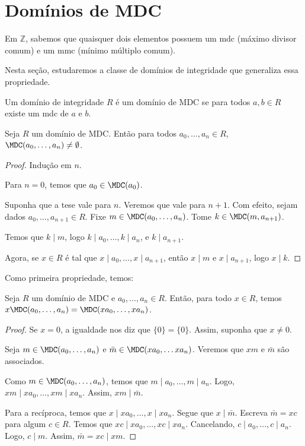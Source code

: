 \section{Domínios de MDC}
Em $\mathbb Z$, sabemos que quaisquer dois elementos possuem um mdc (máximo divisor comum) e um mmc (mínimo múltiplo comum).

Nesta seção, estudaremos a classe de domínios de integridade que generaliza essa propriedade.

\begin{definition}
    Um domínio de integridade $R$ é um domínio de MDC se para todos $a, b \in R$ existe um mdc de $a$ e $b$.
\end{definition}

\begin{lemma}
    Seja $R$ um domínio de MDC. Então para todos $a_0, \dots, a_n \in R$, $\MDC(a_0, \dots, a_n)\neq \emptyset$.
\end{lemma}
\begin{proof}
Indução em $n$.

Para $n=0$, temos que $a_0\in \MDC(a_0)$.

Suponha que a tese vale para $n$.
Veremos que vale para $n+1$.
Com efeito, sejam dados $a_0, \dots, a_{n+1}\in R$. Fixe $m \in \MDC(a_0, \dots, a_n)$.
Tome $k \in \MDC(m, a_{n+1})$.

Temos que $k\mid m$, logo $k\mid a_0, \dots, k\mid a_n$, e $k\mid a_{n+1}$.

Agora, se $x \in R$ é tal que $x\mid a_0, \dots, x\mid a_{n+1}$, então $x\mid m$ e $x\mid a_{n+1}$, logo $x\mid k$.
\end{proof}

Como primeira propriedade, temos:

\begin{prop}
    Seja $R$ um domínio de MDC e $a_0, \dots, a_n\in R$.
    Então, para todo $x \in R$, temos $x\MDC(a_0, \dots, a_n)=\MDC(xa_0, \dots, xa_n)$.
\end{prop}
\begin{proof}
    Se $x=0$, a igualdade nos diz que $\{0\}=\{0\}$.
    Assim, suponha que $x\neq 0$.

    Seja $m\in \MDC(a_0, \dots, a_n)$ e $\bar m \in \MDC(xa_0,\dots xa_n)$.
    Veremos que $xm$ e $\bar m$ são associados.

    Como $m\in \MDC(a_0, \dots, a_n)$, temos que $m\mid a_0, \dots, m\mid a_n$.
    Logo, $xm\mid xa_0, \dots, xm\mid xa_n$.
    Assim, $xm\mid \bar m$.

    Para a recíproca, temos que $x\mid xa_0, \dots, x\mid xa_n$. Segue que $x\mid \bar m$.
    Escreva $\bar m=xc$ para algum $c \in R$.
    Temos que $xc\mid xa_0, \dots, xc\mid xa_n$.
    Cancelando, $c\mid a_0, \dots, c\mid a_n$.
    Logo, $c\mid m$. Assim, $\bar m=xc\mid xm$.
\end{proof}

